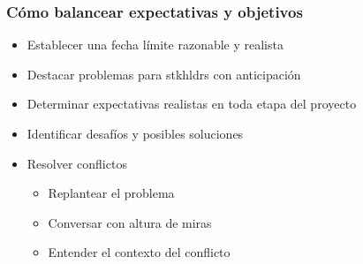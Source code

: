 \subsubsection{Cómo balancear expectativas y objetivos}
\begin{itemize}
    \item {Establecer una fecha límite razonable y realista}
    \item {Destacar problemas para \gls{stkhldrs} con anticipación}
    \item {Determinar expectativas realistas en toda etapa del proyecto}
    \item {Identificar desafíos y posibles soluciones}
    \item {Resolver conflictos 
    \begin{itemize}
        \item {Replantear el problema}
        \item {Conversar con altura de miras}
        \item {Entender el contexto del conflicto}
    \end{itemize}}
\end{itemize}

